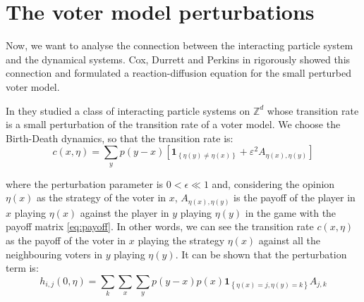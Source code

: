 \section{The voter model perturbations\label{sec:Voter-model-perturbation}}

Now, we want to analyse the connection between the interacting particle
system and the dynamical systems. Cox, Durrett and Perkins in \cite{cox_voter_2011}
rigorously showed this connection and formulated a reaction-diffusion
equation for the small perturbed voter model. 

In \cite{durrett_spatial_2014,cox_voter_2011} they studied a class
of interacting particle systems on $\mathbb{Z}^{d}$ whose transition
rate is a small perturbation of the transition rate of a voter model.
We choose the Birth-Death dynamics, so that the transition rate is:
\begin{equation}
c\left(x,\eta\right)=\sum_{y}p\left(y-x\right)\left[\mathbf{1}_{\left\{ \eta\left(y\right)\neq\eta\left(x\right)\right\} }+\varepsilon^{2}A_{\eta\left(x\right),\eta\left(y\right)}\right]\label{eq:perturbation}
\end{equation}

where the perturbation parameter is $0<\epsilon\ll1$ and, considering
the opinion $\eta\left(x\right)$ as the strategy of the voter in
$x$, $A_{\eta\left(x\right),\eta\left(y\right)}$ is the payoff of
the player in $x$ playing $\eta\left(x\right)$ against the player
in $y$ playing $\eta\left(y\right)$ in the game with the payoff
matrix \ref{eq:payoff}. In other words, we can see the transition
rate $c\left(x,\eta\right)$ as the payoff of the voter in $x$ playing
the strategy $\eta\left(x\right)$ against all the neighbouring voters
in $y$ playing $\eta\left(y\right)$. It can be shown that the perturbation
term is:
\begin{equation}
h_{i,j}\left(0,\eta\right)=\sum_{k}\sum_{x}\sum_{y}p\left(y-x\right)p\left(x\right)\mathbf{1}_{\left\{ \eta\left(x\right)=j,\eta\left(y\right)=k\right\} }A_{j,k}\label{eq:hij}
\end{equation}

